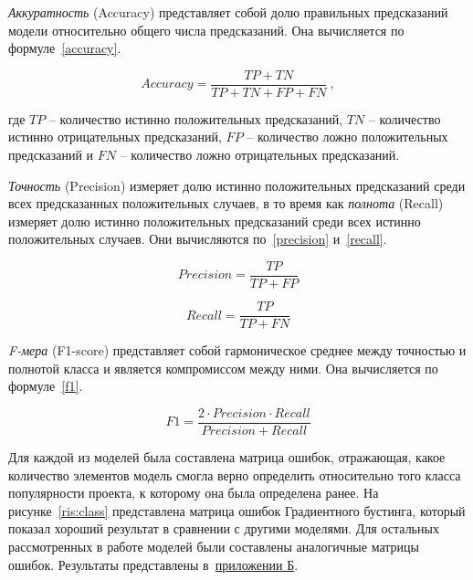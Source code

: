 \textit{Аккуратность} (Accuracy) представляет собой долю правильных предсказаний модели относительно общего числа предсказаний. Она вычисляется по формуле~\ref{accuracy}.

\begin{equation}
\label{accuracy}
    Accuracy = \frac{TP + TN}{TP + TN + FP + FN} \ , 
\end{equation}
\vspace{0.3em}

где \( TP \) -- количество истинно положительных предсказаний, \( TN \) -- количество истинно отрицательных предсказаний, \( FP \) -- количество ложно положительных предсказаний и \( FN \) -- количество ложно отрицательных предсказаний.

\textit{Точность} (Precision) измеряет долю истинно положительных предсказаний среди всех предсказанных положительных случаев, в то время как \textit{полнота} (Recall) измеряет долю истинно положительных предсказаний среди всех истинно положительных случаев. Они вычисляются по~\ref{precision} и~\ref{recall}.

\begin{equation}
\label{precision}
    Precision = \frac{TP}{TP + FP} 
\end{equation}


\begin{equation}
\label{recall}
    Recall = \frac{TP}{TP + FN} 
\end{equation}
\vspace{1.5em}

\textit{F-мера} (F1-score) представляет собой гармоническое среднее между точностью и полнотой класса и является компромиссом между ними. Она вычисляется по формуле~\ref{f1}.

\begin{equation}
\label{f1}
F1 = \frac{2 \cdot Precision \cdot Recall}{Precision + Recall} 
\end{equation}
\vspace{1.5em}

Для каждой из моделей была составлена матрица ошибок, отражающая, какое количество элементов модель смогла верно определить относительно того класса популярности проекта, к которому она была определена ранее. На рисунке~\ref{ris:class} представлена матрица ошибок Градиентного бустинга, который показал хороший результат в сравнении с другими моделями. Для остальных рассмотренных в работе моделей были составлены аналогичные матрицы ошибок. Результаты представлены в~\hyperref[sec:matrix]{приложении Б}. 

